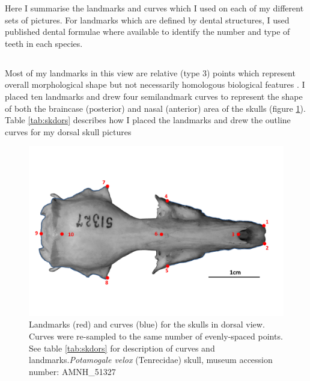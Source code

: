 	Here I summarise the landmarks and curves which I used on each of my different sets of pictures. For landmarks which are defined by dental structures, I used published dental formulae \citep{Nowak1983, MacPhee1987, KnoxJones1992, Marshall1996, Nagorsen2002, Goodman2006, Asher2008, ADW2013} where available to identify the number and type of teeth in each species.
	
\subsection{}
	Most of my landmarks in this view are relative (type 3) points which represent overall morphological shape but not necessarily homologous biological features \citep{Zelditch2012}. I placed ten landmarks and drew four semilandmark curves to represent the shape of both the braincase (posterior) and nasal (anterior) area of the skulls (figure \ref{fig:skdors_landmarks}). Table \ref{tab:skdors} describes how I placed the landmarks and drew the outline curves for my dorsal skull pictures 


\begin{figure}[h]
	\centering
	\includegraphics[width=1\linewidth]{Methods/figures/AMNH_51327_dorsallandmarksdiagram.png}
	\caption[Skulls: dorsal landmarks]
	{Landmarks (red) and curves (blue) for the skulls in dorsal view. Curves were re-sampled to the same number of evenly-spaced points. See table \ref{tab:skdors} for description of curves and landmarks.\textit{Potamogale velox} (Tenrecidae) skull, museum accession number: AMNH\_51327}
	\label{fig:skdors_landmarks}
\end{figure}


